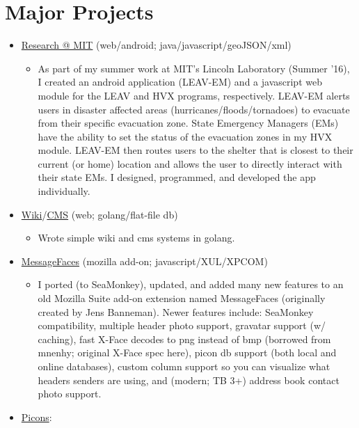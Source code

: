 \documentclass[11pt]{article}
\begin{document}
\section*{Major Projects}
\begin{itemize}
	\item \href{https://docs.google.com/presentation/d/1d6u7eK2fBJElrRpEn1KlkTfReKO_tHj5iCAGb6vgtmg/}{Research @ MIT} (web/android; java/javascript/geoJSON/xml)
	\begin{itemize}
	\item As part of my summer work at MIT's Lincoln Laboratory (Summer '16), I created an android application (LEAV-EM) and a javascript web module for the LEAV and HVX programs, respectively. LEAV-EM alerts users in disaster affected areas (hurricanes/floods/tornadoes) to evacuate from their specific evacuation zone. State Emergency Managers (EMs) have the ability to set the status of the evacuation zones in my HVX module. LEAV-EM then routes users to the shelter that is closest to their current (or home) location and allows the user to directly interact with their state EMs. I designed, programmed, and developed the app individually.
	\end{itemize}
	\item \href{https://github.com/JohnDDuncanIII/wiki}{Wiki}/\href{https://github.com/JohnDDuncanIII/blog}{CMS} (web; golang/flat-file db)
	\begin{itemize}
	\item Wrote simple wiki and cms systems in golang.
	\end{itemize}
	\item \href{https://github.com/JohnDDuncanIII/MessageFaces}{MessageFaces} (mozilla add-on; javascript/XUL/XPCOM)
	\begin{itemize}
	\item I ported (to SeaMonkey), updated, and added many new features to an old Mozilla Suite add-on extension named MessageFaces (originally created by Jens Banneman). Newer features include: SeaMonkey compatibility, multiple header photo support, gravatar support (w/ caching), fast X-Face decodes to png instead of bmp (borrowed from mnenhy; original X-Face spec here), picon db support (both local and online databases), custom column support so you can visualize what headers senders are using, and (modern; TB 3+) address book contact photo support.
	\end{itemize}
	\item \href{https://github.com/JohnDDuncanIII/picons}{Picons}: 
	\begin{itemize}

\end{itemize}
\end{itemize}
\end{document}
